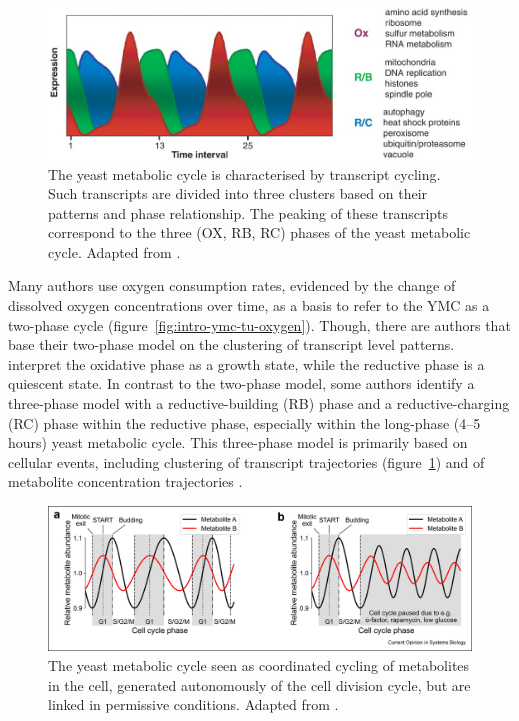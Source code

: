 \begin{figure}
  \centering
  \includegraphics[width=1.0\textwidth]{tuLogicYeastMetabolic2005_3d_adapted}
  \caption{
    The yeast metabolic cycle is characterised by transcript cycling.
    Such transcripts are divided into three clusters based on their patterns and phase relationship.
    The peaking of these transcripts correspond to the three (OX, RB, RC) phases of the yeast metabolic cycle.
    Adapted from \textcite{tuLogicYeastMetabolic2005}.}
  \label{fig:intro-ymc-tu-transcripts}
\end{figure}

Many authors \parencite{slavovMetabolicCyclingCell2011, murrayRedoxRegulationRespiring2011, caustonMetabolicRhythmsFramework2018} use oxygen consumption rates, evidenced by the change of dissolved oxygen concentrations over time, as a basis to refer to the YMC as a two-phase cycle (figure~\ref{fig:intro-ymc-tu-oxygen}).
Though, there are authors \parencite{machneYinYangYeast2012} that base their two-phase model on the clustering of transcript level patterns.
\textcite{krishnaMinimalPushPull2018} interpret the oxidative phase as a growth state, while the reductive phase is a quiescent state.
In contrast to the two-phase model, some authors identify a three-phase model with a reductive-building (RB) phase and a reductive-charging (RC) phase within the reductive phase, especially within the long-phase (4--5 hours) yeast metabolic cycle.
This three-phase model is primarily based on cellular events, including clustering of transcript trajectories \parencite{tuLogicYeastMetabolic2005} (figure~\ref{fig:intro-ymc-tu-transcripts}) and of metabolite concentration trajectories \parencite{tuCyclicChangesMetabolic2007}.

\begin{figure}
  \centering
  \includegraphics[width=1.0\textwidth]{zylstraMetabolicDynamicsCell2022_1}
  \caption{
    The yeast metabolic cycle seen as coordinated cycling of metabolites in the cell, generated autonomously of the cell division cycle, but are linked in permissive conditions.
    Adapted from \textcite{zylstraMetabolicDynamicsCell2022}.}
  \label{fig:intro-ymc-overview-ss}
\end{figure}

